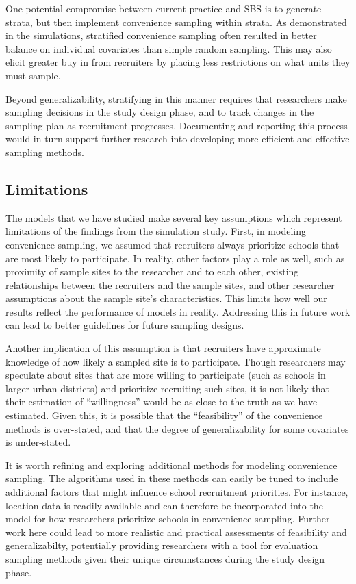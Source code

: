 \documentclass[english,man,floatsintext]{apa6}
\begin{document}
One potential compromise between current practice and SBS is to generate strata, but then implement convenience sampling within strata. As demonstrated in the simulations, stratified convenience sampling often resulted in better balance on individual covariates than simple random sampling. This may also elicit greater buy in from recruiters by placing less restrictions on what units they must sample.

Beyond generalizability, stratifying in this manner requires that researchers make sampling decisions in the study design phase, and to track changes in the sampling plan as recruitment progresses. Documenting and reporting this process would in turn support further research into developing more efficient and effective sampling methods.

\hypertarget{limitations}{%
\subsection{Limitations}\label{limitations}}

The models that we have studied make several key assumptions which represent limitations of the findings from the simulation study. First, in modeling convenience sampling, we assumed that recruiters always prioritize schools that are most likely to participate. In reality, other factors play a role as well, such as proximity of sample sites to the researcher and to each other, existing relationships between the recruiters and the sample sites, and other researcher assumptions about the sample site's characteristics. This limits how well our results reflect the performance of models in reality. Addressing this in future work can lead to better guidelines for future sampling designs.

Another implication of this assumption is that recruiters have approximate knowledge of how likely a sampled site is to participate. Though researchers may speculate about sites that are more willing to participate (such as schools in larger urban districts) and prioritize recruiting such sites, it is not likely that their estimation of \enquote{willingness} would be as close to the truth as we have estimated. Given this, it is possible that the \enquote{feasibility} of the convenience methods is over-stated, and that the degree of generalizability for some covariates is under-stated.

It is worth refining and exploring additional methods for modeling convenience sampling. The algorithms used in these methods can easily be tuned to include additional factors that might influence school recruitment priorities. For instance, location data is readily available and can therefore be incorporated into the model for how researchers prioritize schools in convenience sampling. Further work here could lead to more realistic and practical assessments of feasibility and generalizabilty, potentially providing researchers with a tool for evaluation sampling methods given their unique circumstances during the study design phase.
\end{document}
